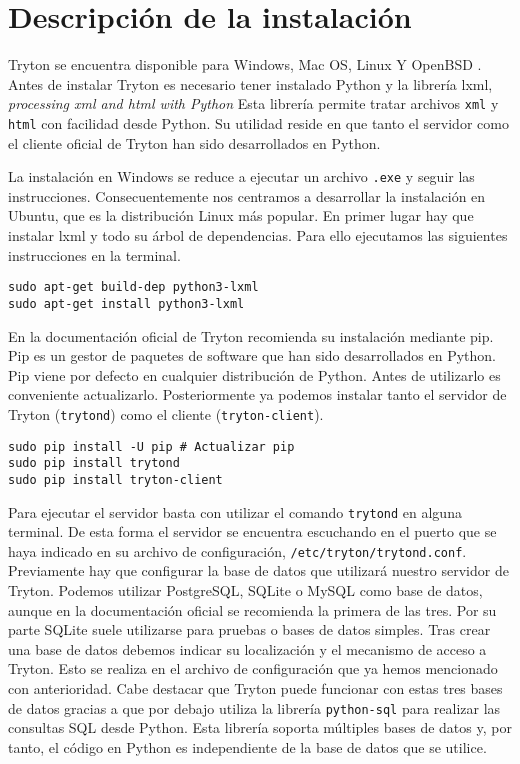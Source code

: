 \documentclass{article}
\begin{document}
\section{Descripción de la instalación}

Tryton se encuentra disponible para Windows, Mac OS, Linux Y OpenBSD \cite{descarga}. Antes de instalar Tryton es necesario tener instalado Python y la librería lxml, \emph{processing xml and html with Python} \cite{lxml} Esta librería permite tratar archivos \texttt{xml} y \texttt{html} con facilidad desde Python. Su utilidad reside en que tanto el servidor como el cliente oficial de Tryton han sido desarrollados en Python.

La instalación en Windows se reduce a ejecutar un archivo \texttt{.exe} y seguir las instrucciones. Consecuentemente nos centramos a desarrollar la instalación en Ubuntu, que es la distribución Linux más popular. En primer lugar hay que instalar lxml y todo su árbol de dependencias. Para ello ejecutamos las siguientes instrucciones en la terminal.

\begin{verbatim}
sudo apt-get build-dep python3-lxml
sudo apt-get install python3-lxml
\end{verbatim}

En la documentación oficial de Tryton recomienda su instalación mediante pip. Pip es un gestor de paquetes de software que han sido desarrollados en Python.  Pip viene por defecto en cualquier distribución de Python. Antes de utilizarlo es conveniente actualizarlo. Posteriormente ya podemos instalar tanto el servidor de Tryton (\texttt{trytond}) como el cliente (\texttt{tryton-client}).

\begin{verbatim}
sudo pip install -U pip # Actualizar pip
sudo pip install trytond
sudo pip install tryton-client
\end{verbatim}

Para ejecutar el servidor basta con utilizar el comando \texttt{trytond} en alguna terminal. De esta forma el servidor se encuentra escuchando en el puerto que se haya indicado en su archivo de configuración, \texttt{/etc/tryton/trytond.conf}. Previamente hay que configurar la base de datos que utilizará nuestro servidor de Tryton. Podemos utilizar PostgreSQL, SQLite o MySQL como base de datos, aunque en la documentación oficial se recomienda la primera de las tres. Por su parte SQLite suele utilizarse para pruebas o bases de datos simples. Tras crear una base de datos debemos indicar su localización y el mecanismo de acceso a Tryton. Esto se realiza en el archivo de configuración que ya hemos mencionado con anterioridad. Cabe destacar que Tryton puede funcionar con estas tres bases de datos gracias a que por debajo utiliza la librería \texttt{python-sql} para realizar las consultas SQL desde Python. Esta librería soporta múltiples bases de datos y, por tanto, el código en Python es independiente de la base de datos que se utilice.
\end{document}
